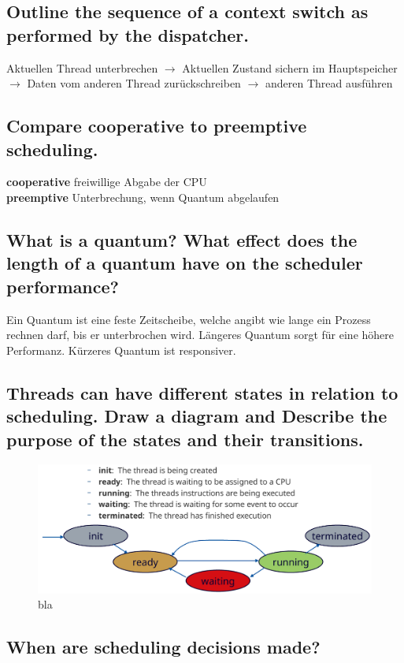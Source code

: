 \subsection{Outline the sequence of a context switch as performed by the dispatcher.}
Aktuellen Thread unterbrechen $\rightarrow$ Aktuellen Zustand sichern im Hauptspeicher $\rightarrow$ Daten vom anderen Thread zur\"uckschreiben $\rightarrow$ anderen Thread ausf\"uhren

\subsection{Compare cooperative to preemptive scheduling.}
\textbf{cooperative} freiwillige Abgabe der CPU\\
\textbf{preemptive} Unterbrechung, wenn Quantum abgelaufen

\subsection{What is a quantum? What effect does the length of a quantum have on the scheduler performance?}
Ein Quantum ist eine feste Zeitscheibe, welche angibt wie lange ein Prozess rechnen darf, bis er unterbrochen wird. L\"angeres Quantum sorgt f\"ur eine h\"ohere Performanz. K\"urzeres Quantum ist responsiver.

\subsection{Threads can have different states in relation to scheduling. Draw a diagram and Describe the purpose of the states and their transitions.}

\begin{figure}[H]
	\centering
	\includegraphics[width=0.7\linewidth]{Pictures/scheduling_dia}
	\caption{bla}
	\label{fig:schema01}
\end{figure}

\subsection{When are scheduling decisions made?}